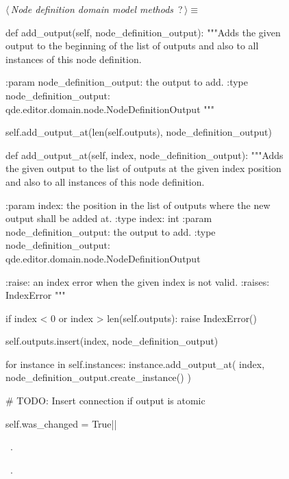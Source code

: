 \documentclass[%
    a4paper,    %
    justified,  %
    nobib,      %
    openany     %
]{tufte-book}
\makeatletter
\renewcommand{\label}[1]{\@tufte@label{##1}}%
\makeatother
\begin{document}
\begin{figure}
\begin{flushleft} \small
\begin{minipage}{\linewidth}\label{scrap143}\raggedright\small
{} $\langle\,${\itshape Node definition domain model methods}\nobreak\ {\footnotesize {?}}$\,\rangle\equiv$
\vspace{-1ex}
\begin{pythoncode}
def add_output(self, node_definition_output):
    """Adds the given output to the beginning of the list of outputs and
    also to all instances of this node definition.

    :param node_definition_output: the output to add.
    :type  node_definition_output: qde.editor.domain.node.NodeDefinitionOutput
    """

    self.add_output_at(len(self.outputs), node_definition_output)

def add_output_at(self, index, node_definition_output):
    """Adds the given output to the list of outputs at the given index
    position and also to all instances of this node definition.

    :param index: the position in the list of outputs where the new output
                  shall be added at.
    :type  index: int
    :param node_definition_output: the output to add.
    :type  node_definition_output: qde.editor.domain.node.NodeDefinitionOutput

    :raise: an index error when the given index is not valid.
    :raises: IndexError
    """

    if index < 0 or index > len(self.outputs):
        raise IndexError()

    self.outputs.insert(index, node_definition_output)

    for instance in self.instances:
        instance.add_output_at(
            index,
            node_definition_output.create_instance()
        )

    # TODO: Insert connection if output is atomic

    self.was_changed = True|\NWsep|
\end{pythoncode}
\vspace{1.5ex}
\footnotesize
\begin{list}{}{\setlength{\itemsep}{-\parsep}\setlength{\itemindent}{-\leftmargin}}
\item \NWtxtMacroDefBy\ .
\item \NWtxtMacroRefIn\ .


\end{list}
\end{minipage}
\end{flushleft}
\end{figure}
\end{document}
